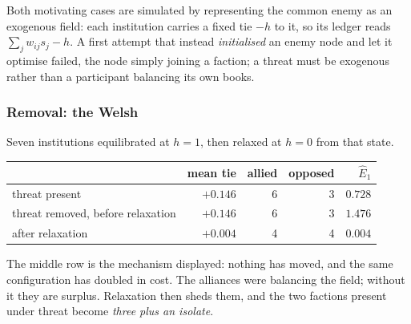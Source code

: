 \documentclass[11pt]{article}
\numberwithin{equation}{section}
\theoremstyle{plain}
\theoremstyle{definition}
\theoremstyle{remark}
\begin{document}
Both motivating cases are simulated by representing the common enemy as
an exogenous field: each institution carries a fixed tie $-h$ to it, so
its ledger reads $\sum_j w_{ij}s_j-h$. A first attempt that instead
\emph{initialised} an enemy node and let it optimise failed, the node
simply joining a faction; a threat must be exogenous rather than a
participant balancing its own books.

\subsubsection{Removal: the Welsh}\label{ad:subsub:welsh}

Seven institutions equilibrated at $h=1$, then relaxed at $h=0$ from
that state.

\begin{center}\small
\begin{tabular}{@{}lrrrr@{}}
\toprule
& mean tie & allied & opposed & $\hat E_1$\\
\midrule
threat present & $+0.146$ & 6 & 3 & $0.728$\\
threat removed, before relaxation & $+0.146$ & 6 & 3 & $1.476$\\
after relaxation & $+0.004$ & 4 & 4 & $0.004$\\
\bottomrule
\end{tabular}
\end{center}

The middle row is the mechanism displayed: nothing has moved, and the
same configuration has doubled in cost. The alliances were balancing the
field; without it they are surplus. Relaxation then sheds them, and the
two factions present under threat become \emph{three plus an isolate}.
\end{document}
